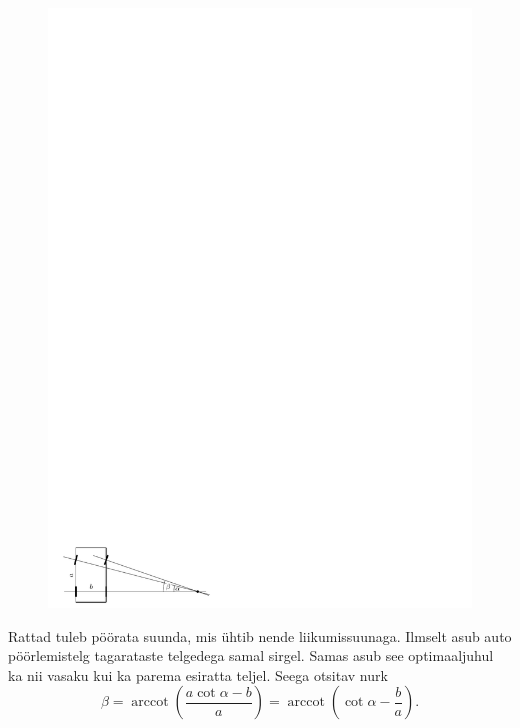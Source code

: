 {\ifSolution
\begin{figure}
\includegraphics[width=\linewidth]{2012-v3g-05-r_joonis}
\end{figure}
Rattad tuleb pöörata suunda, mis ühtib nende liikumissuunaga. Ilmselt asub auto
pöörlemistelg tagarataste telgedega samal sirgel. Samas asub see optimaaljuhul
ka nii vasaku kui ka parema esiratta teljel. Seega otsitav nurk
\[
\beta =
\operatorname{arccot} \left( \frac{a \cot\alpha - b}{a} \right)
=
\operatorname{arccot} \left( \cot\alpha - \frac ba \right).
\]
\fi


}
